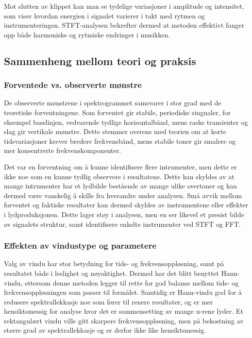 Mot slutten av klippet kan man se tydelige variasjoner i amplitude og intensitet, som viser hvordan energien i signalet 
varierer i takt med rytmen og instrumenteringen. STFT-analysen bekrefter dermed at metoden effektivt fanger opp både harmoniske
og rytmiske endringer i musikken.



\subsection{Sammenheng mellom teori og praksis}

\subsubsection{Forventede vs. observerte mønstre}
De observerte mønstrene i spektrogrammet samsvarer i stor grad med de teoretiske forventningene. Som forventet gir stabile,
periodiske singnaler, for eksempel basslinjen, vedvarende tydlige horisontalbånd, mens raske transienter og slag gir vertikale
mønstre. Dette stemmer overens med teorien om at korte tidsvariasjoner krever bredere frekvensbånd, mens stabile toner gir 
smalere og mer konsentrerte frekvenskomponenter.


Det var en forventning om å kunne identifisere flere intrumenter, men dette er ikke noe som en kunne tydlig observere i 
resultatene. Dette kan skyldes av at mange intrumenter har et lydbilde bestående av mange ulike overtoner og kan dermed være 
vanskelig å skille fra hverandre under analysen.
Små avvik mellom forventet og faktiske resultater kan dermed skyldes av instrumentene eller effekter i lydproduksjonen. Dette 
lager støy i analysen, men en ser likevel et presist bilde av signalets struktur, samt identifisere enkelte instrumenter ved 
STFT og FFT.

\subsubsection{Effekten av vindustype og parametere}
Valg av vindu har stor betydning for tids- og frekvensoppløsning, samt på resultatet både i leslighet og nøyaktighet. Dermed har det blitt
benyttet Hann-vindu, ettersom denne metoden legger til rette for god balanse mellom tids- og frekvensoppløsningen som passer
til formålet. Samtidig er Hann-vindu god for å redusere spektrallekkasje noe som fører til renere resultater, og er mer 
hensiktsmessig for analyse hvor det er sammensetting av mange u-rene lyder. Et rektangulært vindu ville gitt skarpere 
frekvensoppløsning, men på bekostning av større grad av spektrallekkasje og er derfor ikke like hensiktsmessig.


